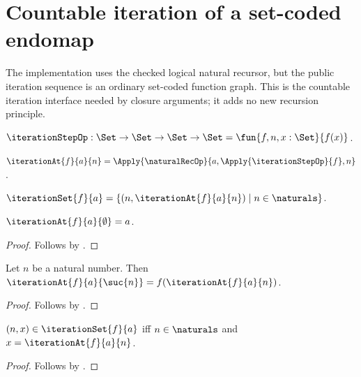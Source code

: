 \section{Countable iteration of a set-coded endomap}



The implementation uses the checked logical natural recursor, but the public
iteration sequence is an ordinary set-coded function graph.  This is the
countable iteration interface needed by closure arguments; it adds no new
recursion principle.

\begin{definition}\label{iteration_step}
    $\iterationStepOp:\Set\to\Set\to\Set\to\Set
        =\fun{f,n,x:\Set}{f(x)}$.
\end{definition}

\begin{definition}\label{iteration_at}
    $\iterationAt{f}{a}{n}
        =\Apply{\naturalRecOp}{a,
            \Apply{\iterationStepOp}{f},n}$.
\end{definition}

\begin{definition}\label{iteration_set}
    $\iterationSet{f}{a}
        =\{(n,\iterationAt{f}{a}{n})\mid n\in\naturals\}$.
\end{definition}

\begin{proposition}\label{iteration_at_zero}
    $\iterationAt{f}{a}{\emptyset}=a$.
\end{proposition}
\begin{proof}
    Follows by
        .
\end{proof}

\begin{proposition}\label{iteration_at_successor}
    Let $n$ be a natural number.
    Then $\iterationAt{f}{a}{\suc{n}}=f(\iterationAt{f}{a}{n})$.
\end{proposition}
\begin{proof}
    Follows by
        .
\end{proof}

\begin{proposition}\label{iteration_set_membership}
    $(n,x)\in\iterationSet{f}{a}$ iff
        $n\in\naturals$ and $x=\iterationAt{f}{a}{n}$.
\end{proposition}
\begin{proof}
    Follows by .
\end{proof}

